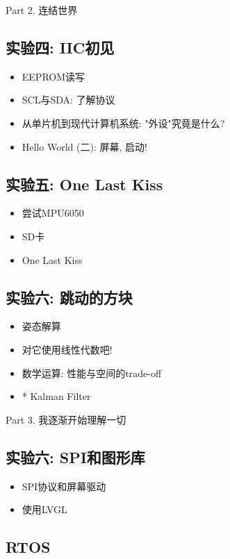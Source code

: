 \Large {Part 2. 连结世界} \normalsize

\subsection{实验四: IIC初见}
\begin{itemize}
	\item EEPROM读写
	\item SCL与SDA: 了解协议
	\item 从单片机到现代计算机系统: "外设"究竟是什么?
	\item Hello World (二): 屏幕, 启动!
\end{itemize}

\subsection{实验五: One Last Kiss}
\begin{itemize}
	\item 尝试MPU6050
	\item SD卡
	\item One Last Kiss
\end{itemize}

\subsection{实验六: 跳动的方块}
\begin{itemize}
	\item 姿态解算
	\item 对它使用线性代数吧!
	\item 数学运算: 性能与空间的trade-off
	\item * Kalman Filter
\end{itemize}

\vspace*{20pt}

\Large {Part 3. 我逐渐开始理解一切} \normalsize

\subsection{实验六: SPI和图形库}
\begin{itemize}
	\item SPI协议和屏幕驱动
	\item 使用LVGL
\end{itemize}

\subsection{RTOS}


